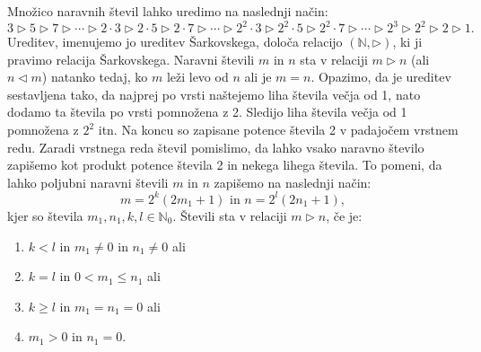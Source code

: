 \documentclass[mat2]{fmfdelo}
\newcommand{\N}{\mathbb N}
\begin{document}
\begin{definicija}\label{def:ureditev-sark}
Množico naravnih števil lahko uredimo na naslednji način:
$$3 \triangleright 5 \triangleright 7 \triangleright \cdots \triangleright 2\cdot 3 \triangleright 2\cdot 5 \triangleright 2\cdot 7 \triangleright \cdots \triangleright 2^2\cdot 3 \triangleright 2^2\cdot 5 \triangleright 2^2\cdot 7 \triangleright \cdots \triangleright 2^3 \triangleright 2^2 \triangleright 2 \triangleright 1.$$
Ureditev, imenujemo jo ureditev Šarkovskega, določa relacijo $(\N, \triangleright)$, ki ji pravimo relacija Šarkovskega. Naravni števili $m$ in $n$ sta v relaciji $m\triangleright n$ (ali $n \triangleleft m$) natanko tedaj, ko $m$ leži levo od $n$ ali je $m=n$. Opazimo, da je ureditev sestavljena tako, da najprej po vrsti naštejemo liha števila večja od 1, nato dodamo ta števila po vrsti pomnožena z 2. Sledijo liha števila večja od 1 pomnožena z $2^2$ itn. Na koncu so zapisane potence števila 2 v padajočem vrstnem redu. Zaradi vrstnega reda števil pomislimo, da lahko vsako naravno število zapišemo kot produkt potence števila 2 in nekega lihega števila. To pomeni, da lahko poljubni naravni števili $m$ in $n$ zapišemo na naslednji način: 
\begin{equation}
m= 2^k(2m_1 +1)\text{ in } n= 2^l(2n_1 +1), \label{eq:zapis}
\end{equation}
 kjer so števila $m_1, n_1, k, l \in \N_0$. Števili sta v relaciji $m \triangleright n$, če je:
\begin{enumerate}[label={(R\arabic*)}]
\item $k<l$ in $m_1 \neq 0$ in $n_1 \neq 0$ ali \label{rel1}
\item $k=l$ in $0<m_1 \leq n_1$ ali \label{rel2}
\item $k \geq l$ in $m_1 = n_1=0$ ali \label{rel3}
\item $m_1>0$ in $n_1 =0$. \label{rel4}
\end{enumerate}
\end{definicija}
\end{document}
